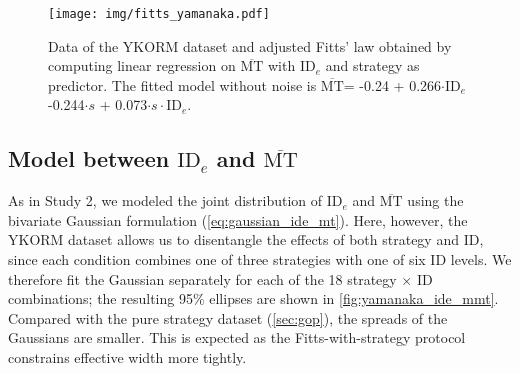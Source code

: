\documentclass[acmlarge, manuscript,review]{acmart}
\newcommand{\mmt}{\ensuremath{\overline{\mt}}\xspace}
\newcommand{\mt}{\ensuremath{{\text{MT}}}\xspace}
\newcommand{\ide}{\ensuremath{{\text{ID}_e}}\xspace}
\begin{document}
\begin{figure}[htbp]
	\centering
	\texttt{[image: img/fitts\_yamanaka.pdf]}
	\caption{Data of the YKORM dataset and adjusted Fitts' law obtained by computing linear regression on \mmt with \ide and strategy as predictor. The fitted model without noise is \mmt = -0.24 + 0.266$\cdot{}\ide$ -0.244$\cdot{}s$ + 0.073$\cdot{}s\cdot{}\ide$.}
	\label{fig:fitts_yamanaka}
\end{figure}




\subsection{Model between \ide and \mmt}
As in Study 2, we modeled the joint distribution of \ide and \mmt using the bivariate Gaussian formulation (\autoref{eq:gaussian_ide_mt}). Here, however, the YKORM dataset allows us to disentangle the effects of both strategy and ID, since each condition combines one of three strategies with one of six ID levels. We therefore fit the Gaussian separately for each of the 18 strategy $\times$ ID combinations; the resulting 95\% ellipses are shown in \autoref{fig:yamanaka_ide_mmt}.
Compared with the pure strategy dataset (\autoref{sec:gop}), the spreads of the Gaussians are smaller. This is expected as the Fitts-with-strategy protocol constrains effective width more tightly.
\end{document}
